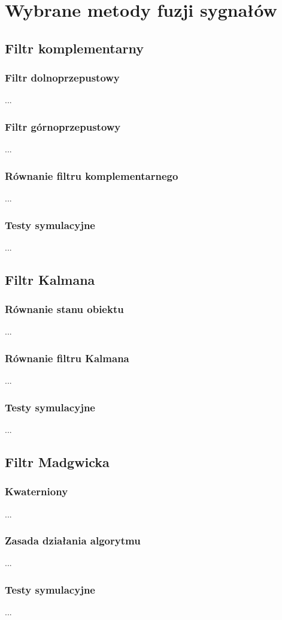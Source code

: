 \chapter{Wybrane metody fuzji sygnałów}
\label{chap:wybrane}

\section{Filtr komplementarny}

\subsection{Filtr dolnoprzepustowy}
...

\subsection{Filtr górnoprzepustowy}
...

\subsection{Równanie filtru komplementarnego}
...

\subsection{Testy symulacyjne}
...
\section{Filtr Kalmana}

\subsection{Równanie stanu obiektu}
...

\subsection{Równanie filtru Kalmana}
...

\subsection{Testy symulacyjne}
...

\section{Filtr Madgwicka}

\subsection{Kwaterniony}
...

\subsection{Zasada działania algorytmu}
...

\subsection{Testy symulacyjne}
...

